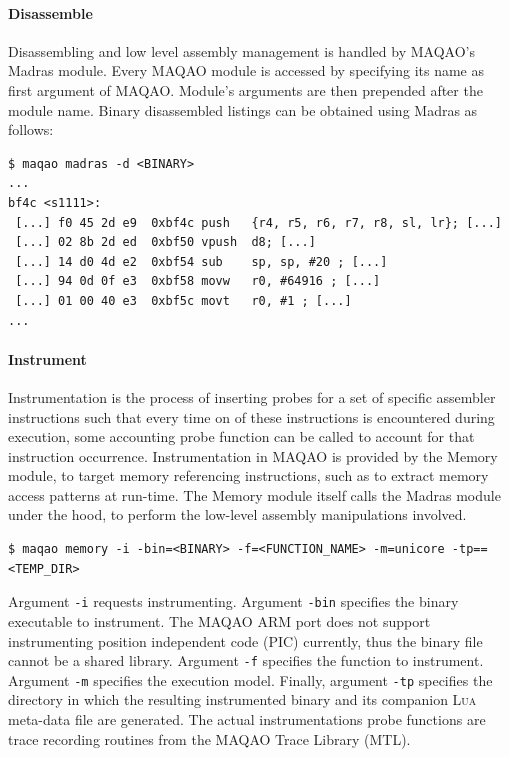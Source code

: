 \documentclass[11pt, a4paper, twoside]{montblanc2}
\def\lua{\textsc{Lua}\xspace}
\begin{document}
\paragraph{Disassemble}

Disassembling and low level assembly management is handled by MAQAO's Madras module. Every MAQAO 
module is accessed by specifying its name as first argument of MAQAO. Module's arguments are then 
prepended after the module name. Binary disassembled listings can be obtained using Madras as 
follows:

\begin{verbatim}
$ maqao madras -d <BINARY>
...
bf4c <s1111>:
 [...] f0 45 2d e9  0xbf4c push   {r4, r5, r6, r7, r8, sl, lr}; [...]
 [...] 02 8b 2d ed  0xbf50 vpush  d8; [...]
 [...] 14 d0 4d e2  0xbf54 sub    sp, sp, #20 ; [...]
 [...] 94 0d 0f e3  0xbf58 movw   r0, #64916 ; [...]
 [...] 01 00 40 e3  0xbf5c movt   r0, #1 ; [...]
...
\end{verbatim}

\paragraph{Instrument}

Instrumentation is the process of inserting probes for a set of specific
assembler instructions such that every time on of these instructions is encountered
during execution, some accounting probe function can be called to account for
that instruction occurrence. Instrumentation in MAQAO is provided by the Memory module,
to target memory referencing instructions, such as to extract memory access
patterns at run-time. The Memory module itself calls the Madras module under the
hood, to perform the low-level assembly manipulations involved.

\begin{verbatim}
$ maqao memory -i -bin=<BINARY> -f=<FUNCTION_NAME> -m=unicore -tp==<TEMP_DIR>
\end{verbatim}

Argument \verb|-i| requests instrumenting. Argument \verb|-bin| specifies the
binary executable to instrument. The MAQAO ARM port does not support
instrumenting position independent code (PIC) currently, thus the binary file
cannot be a shared library. Argument \verb|-f| specifies the function to
instrument. Argument \verb|-m| specifies the execution model. Finally, argument
\verb|-tp| specifies the directory in which the resulting instrumented binary
and its companion \lua meta-data file are generated. The actual instrumentations 
probe functions are trace recording routines from the MAQAO Trace Library (MTL).
\end{document}
